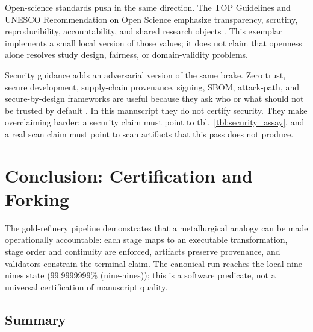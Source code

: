 \documentclass[
  english,
]{article}
\begin{document}
Open-science standards push in the same direction. The TOP Guidelines
and UNESCO Recommendation on Open Science emphasize transparency,
scrutiny, reproducibility, accountability, and shared research objects
\citep{nosek2015top, unesco2021_open_science}. This exemplar implements
a small local version of those values; it does not claim that openness
alone resolves study design, fairness, or domain-validity problems.

Security guidance adds an adversarial version of the same brake. Zero
trust, secure development, supply-chain provenance, signing, SBOM,
attack-path, and secure-by-design frameworks are useful because they ask
who or what should not be trusted by default
\citep{nist_sp800_207_zero_trust, nist_sp800_218_ssdf, slsa_v1_2, sigstore_docs, mitre_attack, cyclonedx_spec, spdx_spec, cisa_secure_by_design}.
In this manuscript they do not certify security. They make overclaiming
harder: a security claim must point to tbl.~\ref{tbl:security_assay},
and a real scan claim must point to scan artifacts that this pass does
not produce.

\newpage

\section{Conclusion: Certification and Forking}\label{sec:conclusion}

The gold-refinery pipeline demonstrates that a metallurgical analogy can
be made operationally accountable: each stage maps to an executable
transformation, stage order and continuity are enforced, artifacts
preserve provenance, and validators constrain the terminal claim. The
canonical run reaches the local nine-nines state (99.9999999\%
(nine-nines)); this is a software predicate, not a universal
certification of manuscript quality.

\subsection{Summary}\label{summary}
\end{document}
